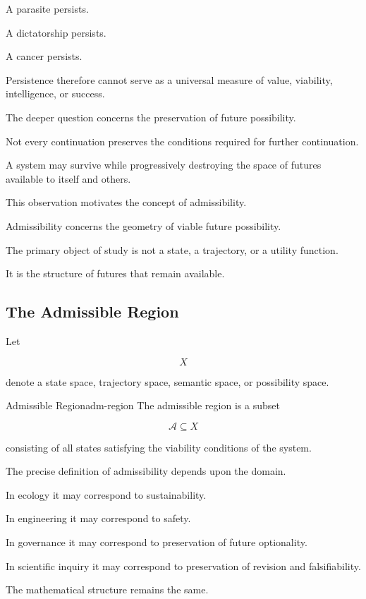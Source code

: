 \documentclass[12pt,twoside,openright]{book}
\begin{document}
A parasite persists.

A dictatorship persists.

A cancer persists.

Persistence therefore cannot serve as a universal measure
of value, viability, intelligence, or success.

The deeper question concerns the preservation of future
possibility.

Not every continuation preserves the conditions required
for further continuation.

A system may survive while progressively destroying the
space of futures available to itself and others.

This observation motivates the concept of admissibility.

Admissibility concerns the geometry of viable future
possibility.

The primary object of study is not a state, a trajectory,
or a utility function.

It is the structure of futures that remain available.

\subsection{The Admissible Region}

Let

\[
X
\]

denote a state space, trajectory space, semantic space,
or possibility space.

\begin{definition}{Admissible Region}{adm-region}
The admissible region is a subset

\[
\mathcal A
\subseteq
X
\]

consisting of all states satisfying the viability
conditions of the system.
\end{definition}

The precise definition of admissibility depends upon the
domain.

In ecology it may correspond to sustainability.

In engineering it may correspond to safety.

In governance it may correspond to preservation of future
optionality.

In scientific inquiry it may correspond to preservation
of revision and falsifiability.

The mathematical structure remains the same.
\end{document}
